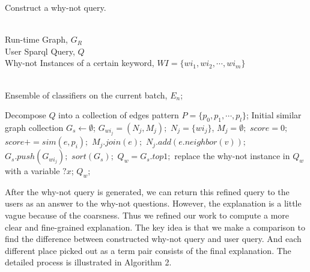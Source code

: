 \documentclass{article}
\begin{document}
\begin{algorithm}[htb]         %
\caption{ Construct a why-not query.} %
\label{alg1:Framwork}                  %
\begin{algorithmic}[1]                %

\REQUIRE ~~\\                         %
    Run-time Graph, $G_R$\\
    User Sparql Query, $Q$\\
    Why-not Instances of a certain keyword, $WI=\{wi_1,wi_2,\cdots,wi_m\}$

\ENSURE ~~\\                          %
    Ensemble of classifiers on the current batch,  $E_n$;

\STATE Decompose $Q$ into a collection of edges pattern $P=\{p_0, p_1, \cdots, p_l\}$;      %
\STATE Initial similar graph collection $G_s \leftarrow \emptyset $;
\STATE $G_{wi_j}=(N_j, M_j);$  $N_j=\{wi_j\}$, $M_j=\emptyset;$  $score=0;$
\STATE $score += sim(e, p_i);$
\STATE $M_j.join(e);$  $N_j.add(e.neighbor(v));$
\ENDIF
\ENDFOR
\ENDFOR
\STATE $G_s.push(G_{wi_j});$
\ENDFOR
\STATE $sort(G_s);$  $Q_w=G_s.top1;$
\STATE replace the why-not instance in $Q_w$ with a variable $?x$;
\RETURN $Q_w$;                %

\end{algorithmic}
\end{algorithm}



After the why-not query is generated, we can return this refined query to the users as an answer to the why-not questions. However, the explanation is a little vague because of the coarsness. Thus we refined our work to compute a more clear and fine-grained explanation. The key idea is that we make a comparison to find the difference between constructed why-not query and user query. And each different place picked out as a term pair consists of the final explanation. The detailed process is illustrated in Algorithm 2.
\end{document}
